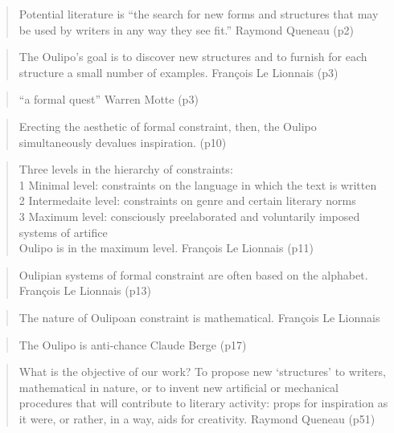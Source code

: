 \begin{quote}
  Potential literature is ``the search for new forms and structures that may be used by writers in any way they see fit.'' Raymond Queneau (p2)
\end{quote}

\begin{quote}
  The Oulipo's goal is to discover new structures and to furnish for each structure a small number of examples. François Le Lionnais (p3)
\end{quote}

\begin{quote}
  ``a formal quest'' Warren Motte (p3)
\end{quote}

\begin{quote}
  Erecting the aesthetic of formal constraint, then, the Oulipo simultaneously devalues inspiration. (p10)
\end{quote}

\begin{quote}
  Three levels in the hierarchy of constraints:\\1 Minimal level: constraints on the language in which the text is written\\2 Intermedaite level: constraints on genre and certain literary norms\\3 Maximum level: consciously preelaborated and voluntarily imposed systems of artifice\\Oulipo is in the maximum level. François Le Lionnais (p11)
\end{quote}

\begin{quote}
  Oulipian systems of formal constraint are often based on the alphabet. François Le Lionnais (p13)
\end{quote}

\begin{quote}
  The nature of Oulipoan constraint is mathematical. François Le Lionnais
\end{quote}

\begin{quote}
  The Oulipo is anti-chance Claude Berge (p17)
\end{quote}

\begin{quote}
  What is the objective of our work? To propose new `structures' to writers, mathematical in nature, or to invent new artificial or mechanical procedures that will contribute to literary activity: props for inspiration as it were, or rather, in a way, aids for creativity. Raymond Queneau (p51)
\end{quote}

